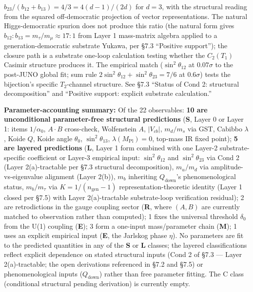 \documentclass[
]{article}
\begin{document}
\begin{itemize}
  \(b_{23}/(b_{12}+b_{13}) = 4/3 = 4(d-1)/(2d)\) for \(d=3\), with the
  structural reading from the squared off-democratic projection of
  vector representations. The natural Higgs-democratic spurion does not
  produce this ratio (the natural form gives
  \(b_{12}:b_{13} = m_\tau/m_\mu \approx 17 : 1\) from Layer 1
  mass-matrix algebra applied to a generation-democratic substrate
  Yukawa, per §7.3 ``Positive support''); the closure path is a
  substrate one-loop calculation testing whether the \(C_2(T_1)\)
  Casimir structure produces it. The empirical match
  (\(\sin^2\theta_{12}\) at \(0.07\sigma\) to the post-JUNO global fit;
  sum rule \(2\sin^2\theta_{12} + \sin^2\theta_{23} = 7/6\) at
  \(0.6\sigma\)) tests the bijection's specific \(T_2\)-channel
  structure. See §7.3 ``Status of Cond 2: structural decomposition'' and
  ``Positive support: explicit substrate calculation.''
\end{itemize}

\textbf{Parameter-accounting summary:} Of the 22 observables: \textbf{10
are unconditional parameter-free structural predictions} (\textbf{S},
Layer 0 or Layer 1: items \(1/\alpha_0\), \(A \cdot B\) cross-check,
Wolfenstein \(A\), \(|V_{cb}|\), \(m_d/m_s\) via GST, Cabibbo
\(\lambda\), Koide \(Q\), Koide angle \(\theta_0\),
\(\sin^2\theta_{13}\), \(\lambda(M_{\text{Pl}}) = 0\), top-mass IR fixed
point); \textbf{5 are layered predictions} (\textbf{L}, Layer 1 form
combined with one Layer-2 substrate-specific coefficient or Layer-3
empirical input: \(\sin^2\theta_{12}\) and \(\sin^2\theta_{23}\) via
Cond 2 (Layer 2(a)-tractable per §7.3 structural decomposition),
\(m_u/m_d\) via amplitude-vs-eigenvalue alignment (Layer 2(b)), \(m_b\)
inheriting \(Q_{\text{down}}\)'s phenomenological status, \(m_b/m_\tau\)
via \(K = 1/(n_{\text{gen}} - 1)\) representation-theoretic identity
(Layer 1 closed per §7.5) with Layer 2(a)-tractable substrate-loop
verification residual); 2 are retrodictions in the gauge coupling sector
(\textbf{R}, where \((A, B)\) are currently matched to observation
rather than computed); 1 fixes the universal threshold \(\delta_0\) from
the U(1) coupling (\textbf{E}); 3 form a one-input mass/parameter chain
(\textbf{M}); 1 uses an explicit empirical input (\textbf{E}, the
Jarlskog phase \(\eta\)). No parameters are fit to the predicted
quantities in any of the \textbf{S} or \textbf{L} classes; the layered
classifications reflect explicit dependence on stated structural inputs
(Cond 2 of §7.3 --- Layer 2(a)-tractable; the open derivations
referenced in §7.2 and §7.5) or phenomenological inputs
(\(Q_\text{down}\)) rather than free parameter fitting. The C class
(conditional structural pending derivation) is currently empty.
\end{document}
